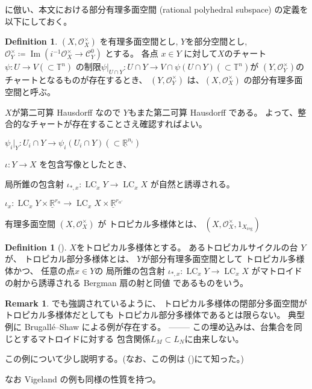 \documentclass[a4paper,dvipdfmx,reqno,12pt]{amsart}
\theoremstyle{definition}
\newtheorem{definition}[theorem]{Definition}
\newtheorem{remark}[theorem]{Remark}
\newcommand{\deq}{\coloneqq}
\newcommand{\opn}[1]{\operatorname{#1}}
\numberwithin{equation}{section}
\begin{document}
\cite[Definition 2.14]{demedrano2023chern}
に倣い、本文における部分有理多面空間
(rational polyhedral subspace)
の定義を以下にしておく。


\begin{definition}

$(X,\mathcal{O}_X^{\times})$ を有理多面空間とし,
$Y$を部分空間とし, 
$\mathcal{O}^{\times}_{Y}\deq 
\opn{Im}(i^{-1}\mathcal{O}_X^{\times}\to \mathcal{C}_{Y}^{0})$
とする。
各点 $x\in Y$ に対して$X$のチャート
$\psi\colon U\to V(\subset \mathbb{T}^{n})$
の制限$\psi|_{U\cap Y}\colon U\cap Y\to 
V\cap \psi(U\cap Y)(\subset \mathbb{T}^{n})$が
$(Y,\mathcal{O}_Y^{\times})$のチャートとなるものが存在するとき、
$(Y,\mathcal{O}_Y^{\times})$
は、$(X,\mathcal{O}^{\times}_X)$
の部分有理多面空間と呼ぶ。
\end{definition}

$X$が第二可算 Hausdorff なので
$Y$もまた第二可算 Hausdorff である。
よって、整合的なチャートが存在することさえ確認すればよい。

$\psi_i|_{Y}\colon U_i\cap Y \to \psi_i(U_i\cap Y)(\subset 
\underline{\mathbb{R}}^{n_i})$

$\iota\colon Y \to X$ を包含写像としたとき、

局所錐の包含射
$\iota_{*,x}\colon \opn{LC}_x Y\to \opn{LC}_x X$
が自然と誘導される。



$\iota_{x}\colon \opn{LC}_x Y\times 
\underline{\mathbb{R}}^{r_{\alpha}}
\to \opn{LC}_x X\times \underline{\mathbb{R}}^{r_{\alpha'}}$

有理多面空間 
$(X,\mathcal{O}_X^{\times})$ が
トロピカル多様体とは、
$(X,\mathcal{O}_X^{\times},1_{X_{\opn{reg}}})$

\begin{definition}[{\cite[Definition 2.14]{demedrano2023chern}}]
$X$をトロピカル多様体とする。
あるトロピカルサイクルの台 $Y$ が、
トロピカル部分多様体とは、
$Y$が部分有理多面空間として
トロピカル多様体かつ、
任意の点$x\in Y$の
局所錐の包含射
$\iota_{*,x}\colon \opn{LC}_x Y\to 
\opn{LC}_x X$
がマトロイドの射から誘導される
Bergman 扇の射と同値
であるものをいう。
\end{definition}



\begin{remark}
\cite[Example 2.15]{demedrano2023chern}でも強調されているように、
トロピカル多様体の閉部分多面空間がトロピカル多様体だとしても
トロピカル部分多様体であるとは限らない。
典型例に Brugall\'e--Shaw による例が存在する。
--------
この埋め込みは、台集合を同じとするマトロイドに対する
包含関係$L_M\subset L_N$に由来しない。

この例について少し説明する。(なお、この例は
()にて知った。)

なお Vigeland の例も同様の性質を持つ。
\end{remark}
\end{document}
